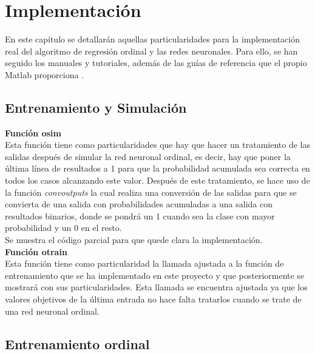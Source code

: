 \chapter{Implementación}
	
	En este capítulo se detallarán aquellas particularidades para la implementación real del algoritmo de regresión ordinal y las redes neuronales. Para ello, se han seguido los manuales y tutoriales, además de las guías de referencia que el propio Matlab proporciona \cite{Matlab_ref,Matlab_nnet,Matlab_gui}.
	
	\section{Entrenamiento y Simulación}
	
		\textbf{Función osim}\\
		
		Esta función tiene como particularidades que hay que hacer un tratamiento de las salidas después de simular la red neuronal ordinal, es decir, hay que poner la última línea de resultados a 1 para que la probabilidad acumulada sea correcta en todos los casos alcanzando este valor. Después de este tratamiento, se hace uso de la función \textit{convoutputs} la cual realiza una conversión de las salidas para que se convierta de una salida con probabilidades acumuladas a una salida con resultados binarios, donde se pondrá un 1 cuando sea la clase con mayor probabilidad y un 0 en el resto.\\
		
		Se muestra el código parcial para que quede clara la implementación.\\
		
		
		
		\textbf{Función otrain}\\
		
		Esta función tiene como particularidad la llamada ajustada a la función de entrenamiento que se ha implementado en este proyecto y que posteriormente se mostrará con sus particularidades. Esta llamada se encuentra ajustada ya que los valores objetivos de la última entrada no hace falta tratarlos cuando se trate de una red neuronal ordinal.\\
		
		
		
	\section{Entrenamiento ordinal}
		
